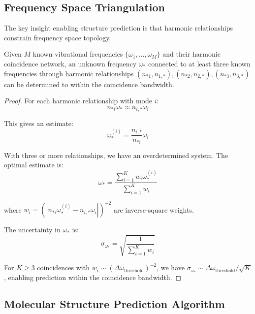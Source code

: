 \subsection{Frequency Space Triangulation}

The key insight enabling structure prediction is that harmonic relationships constrain frequency space topology.

\begin{theorem}
Given $M$ known vibrational frequencies $\{\omega_1, ..., \omega_M\}$ and their harmonic coincidence network, an unknown frequency $\omega_*$ connected to at least three known frequencies through harmonic relationships $(n_{*1}, n_{1,*}), (n_{*2}, n_{2,*}), (n_{*3}, n_{3,*})$ can be determined to within the coincidence bandwidth.
\end{theorem}

\begin{proof}
For each harmonic relationship with mode $i$:
\begin{equation}
n_{*i}\omega_* \approx n_{i,*}\omega_i
\end{equation}

This gives an estimate:
\begin{equation}
\omega_*^{(i)} = \frac{n_{i,*}}{n_{*i}}\omega_i
\end{equation}

With three or more relationships, we have an overdetermined system. The optimal estimate is:
\begin{equation}
\omega_* = \frac{\sum_{i=1}^{K} w_i \omega_*^{(i)}}{\sum_{i=1}^{K} w_i}
\end{equation}

where $w_i = (|n_{*i}\omega_*^{(i)} - n_{i,*}\omega_i|)^{-2}$ are inverse-square weights.

The uncertainty in $\omega_*$ is:
\begin{equation}
\sigma_{\omega_*} = \sqrt{\frac{1}{\sum_{i=1}^{K} w_i}}
\end{equation}

For $K \geq 3$ coincidences with $w_i \sim (\Delta\omega_{\text{threshold}})^{-2}$, we have $\sigma_{\omega_*} \sim \Delta\omega_{\text{threshold}}/\sqrt{K}$, enabling prediction within the coincidence bandwidth.
\end{proof}

\subsection{Molecular Structure Prediction Algorithm}

